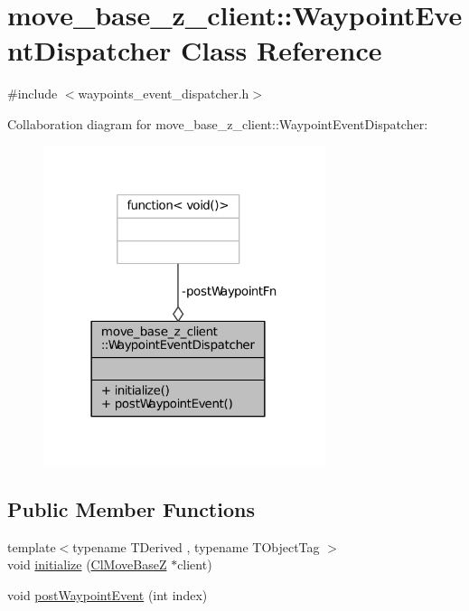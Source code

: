 \hypertarget{classmove__base__z__client_1_1WaypointEventDispatcher}{}\section{move\+\_\+base\+\_\+z\+\_\+client\+:\+:Waypoint\+Event\+Dispatcher Class Reference}
\label{classmove__base__z__client_1_1WaypointEventDispatcher}


{\ttfamily \#include $<$waypoints\+\_\+event\+\_\+dispatcher.\+h$>$}



Collaboration diagram for move\+\_\+base\+\_\+z\+\_\+client\+:\+:Waypoint\+Event\+Dispatcher\+:
\nopagebreak
\begin{figure}[H]
\begin{center}
\leavevmode
\includegraphics[width=234pt]{classmove__base__z__client_1_1WaypointEventDispatcher__coll__graph}
\end{center}
\end{figure}
\subsection*{Public Member Functions}
\begin{DoxyCompactItemize}
\item 
{\footnotesize template$<$typename T\+Derived , typename T\+Object\+Tag $>$ }\\void \hyperlink{classmove__base__z__client_1_1WaypointEventDispatcher_a70fc3a92c59e40648f350f3912d736ae}{initialize} (\hyperlink{classmove__base__z__client_1_1ClMoveBaseZ}{Cl\+Move\+BaseZ} $\ast$client)
\item 
void \hyperlink{classmove__base__z__client_1_1WaypointEventDispatcher_a7421f1eb8aae15a3ddde7c50bea87648}{post\+Waypoint\+Event} (int index)
\end{DoxyCompactItemize}
